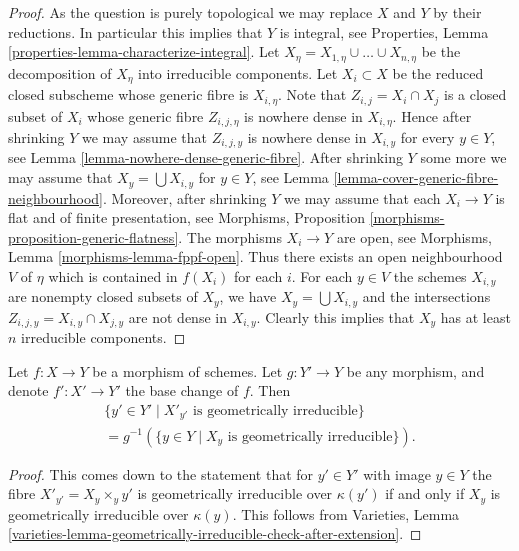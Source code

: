 \begin{proof}
As the question is purely topological we may replace $X$ and $Y$ by
their reductions. In particular this implies that $Y$ is integral, see
Properties, Lemma \ref{properties-lemma-characterize-integral}.
Let $X_\eta = X_{1, \eta} \cup \ldots \cup X_{n, \eta}$
be the decomposition of $X_\eta$ into irreducible components.
Let $X_i \subset X$ be the reduced closed subscheme whose generic
fibre is $X_{i, \eta}$. Note that $Z_{i, j} = X_i \cap X_j$
is a closed subset of $X_i$ whose generic fibre $Z_{i, j, \eta}$
is nowhere dense in $X_{i, \eta}$. Hence after shrinking $Y$ we may
assume that $Z_{i, j, y}$
is nowhere dense in $X_{i, y}$ for every $y \in Y$, see
Lemma \ref{lemma-nowhere-dense-generic-fibre}.
After shrinking $Y$ some more we may assume that
$X_y = \bigcup X_{i, y}$ for $y \in Y$, see
Lemma \ref{lemma-cover-generic-fibre-neighbourhood}.
Moreover, after shrinking $Y$ we may assume that each $X_i \to Y$
is flat and of finite presentation, see
Morphisms, Proposition \ref{morphisms-proposition-generic-flatness}.
The morphisms $X_i \to Y$ are open, see
Morphisms, Lemma \ref{morphisms-lemma-fppf-open}.
Thus there exists an open neighbourhood $V$ of $\eta$ which is contained
in $f(X_i)$ for each $i$.
For each $y \in V$ the schemes $X_{i, y}$ are
nonempty closed subsets of $X_y$, we have $X_y = \bigcup X_{i, y}$
and the intersections $Z_{i, j, y} = X_{i, y} \cap X_{j, y}$
are not dense in $X_{i, y}$. Clearly this implies that
$X_y$ has at least $n$ irreducible components.
\end{proof}

\begin{lemma}
\label{lemma-base-change-fibres-geometrically-irreducible}
Let $f : X \to Y$ be a morphism of schemes.
Let $g : Y' \to Y$ be any morphism, and denote
$f' : X' \to Y'$ the base change of $f$.
Then
\begin{align*}
\{y' \in Y' \mid X'_{y'}\text{ is geometrically irreducible}\} \\
= g^{-1}(\{y \in Y \mid X_y\text{ is geometrically irreducible}\}).
\end{align*}
\end{lemma}

\begin{proof}
This comes down to the statement that for $y' \in Y'$ with image
$y \in Y$ the fibre $X'_{y'} = X_y \times_y y'$ is geometrically
irreducible over $\kappa(y')$ if and only if $X_y$ is geometrically
irreducible over $\kappa(y)$. This follows from
Varieties,
Lemma \ref{varieties-lemma-geometrically-irreducible-check-after-extension}.
\end{proof}

